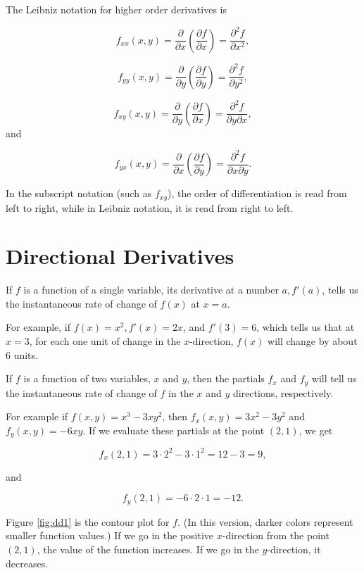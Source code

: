\documentclass[
]{book}
\theoremstyle{definition}
\theoremstyle{definition}
\theoremstyle{definition}
\theoremstyle{definition}
\theoremstyle{remark}
\begin{document}
The Leibniz notation for higher order derivatives is

\[f_{xx}(x,y)=\frac{\partial}{\partial x}\left(\frac{\partial f}{\partial x}\right)=\frac{\partial^2 f}{\partial x^2},\]

\[f_{yy}(x,y)=\frac{\partial}{\partial y}\left(\frac{\partial f}{\partial y}\right)=\frac{\partial^2 f}{\partial y^2},\]

\[f_{xy}(x,y)=\frac{\partial}{\partial y}\left(\frac{\partial f}{\partial x}\right)=\frac{\partial^2 f}{\partial y\partial x},\]
and

\[f_{yx}(x,y)=\frac{\partial}{\partial x}\left(\frac{\partial f}{\partial y}\right)=\frac{\partial^2 f}{\partial x\partial y}.\]

In the subscript notation (such as \(f_{xy}\)), the order of differentiation is read from left to right, while in Leibniz notation, it is read from right to left.

\section{Directional Derivatives}\label{directional-derivatives}

If \(f\) is a function of a single variable, its derivative at a number \(a, f'(a)\), tells us the instantaneous rate of change of \(f(x)\) at \(x=a.\)

For example, if \(f(x)=x^2, f'(x)=2x\), and \(f'(3)=6\), which tells us that at \(x=3\), for each one unit of change in the \(x\)-direction, \(f(x)\) will change by about 6 units.

If \(f\) is a function of two variables, \(x\) and \(y\), then the partials \(f_x\) and \(f_y\) will tell us the instantaneous rate of change of \(f\) in the \(x\) and \(y\) directions, respectively.

For example if \(f(x,y)=x^3-3xy^2\), then \(f_x(x,y)=3x^2-3y^2\) and \(f_y(x,y)=-6xy\). If we evaluate these partials at the point \((2,1)\), we get

\[f_x(2,1)=3\cdot2^2-3\cdot 1^2=12-3=9,\]

and

\[f_y(2,1)=-6\cdot 2\cdot 1=-12.\]

Figure \ref{fig:dd1} is the contour plot for \(f\). (In this version, darker colors represent smaller function values.) If we go in the positive \(x\)-direction from the point \((2,1)\), the value of the function increases. If we go in the \(y\)-direction, it decreases.
\end{document}
